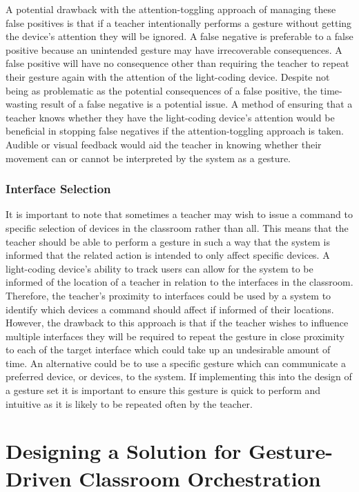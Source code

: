 \documentclass[link]{IWCOMP}
\begin{document}
A potential drawback with the attention-toggling approach of managing these false positives is that if a teacher intentionally performs a gesture without getting the device's attention they will be ignored.
A false negative is preferable to a false positive because an unintended gesture may have irrecoverable consequences.
A false positive will have no consequence other than requiring the teacher to repeat their gesture again with the attention of the light-coding device.
Despite not being as problematic as the potential consequences of a false positive, the time-wasting result of a false negative is a potential issue.
A method of ensuring that a teacher knows whether they have the light-coding device's attention would be beneficial in stopping false negatives if the attention-toggling approach is taken.
Audible or visual feedback would aid the teacher in knowing whether their movement can or cannot be interpreted by the system as a gesture.

\subsubsection{Interface Selection}  
\label{subsubsec:interfaceSelection}

It is important to note that sometimes a teacher may wish to issue a command to specific selection of devices in the classroom rather than all.
This means that the teacher should be able to perform a gesture in such a way that the system is informed that the related action is intended to only affect specific devices.
A light-coding device's ability to track users can allow for the system to be informed of the location of a teacher in relation to the interfaces in the classroom.
Therefore, the teacher's proximity to interfaces could be used by a system to identify which devices a command should affect if informed of their locations.
However, the drawback to this approach is that if the teacher wishes to influence multiple interfaces they will be required to repeat the gesture in close proximity to each of the target interface which could take up an undesirable amount of time.
An alternative could be to use a specific gesture which can communicate a preferred device, or devices, to the system.
If implementing this into the design of a gesture set it is important to ensure this gesture is quick to perform and intuitive as it is likely to be repeated often by the teacher.


\section{Designing a Solution for Gesture-Driven Classroom Orchestration} 
\label{sec:solutionDesign}
\end{document}
